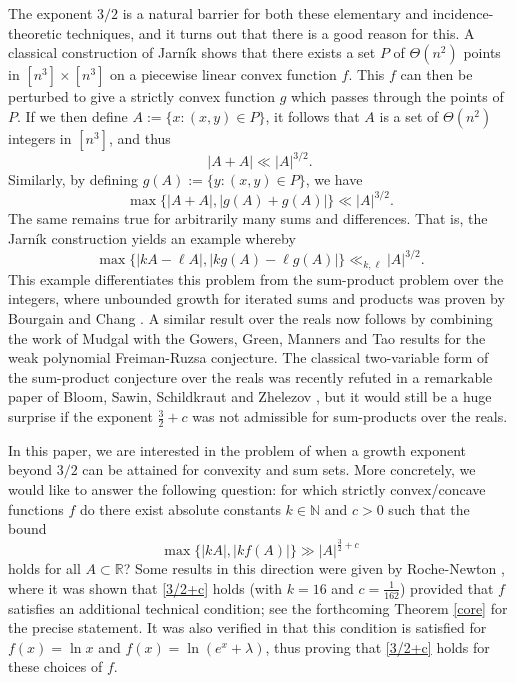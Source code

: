 \documentclass[11pt]{amsart}
\begin{document}
The exponent $3/2$ is a natural barrier for both these elementary and incidence-theoretic techniques, and it turns out that there is a good reason for this. A classical construction of Jarn\'{i}k \cite{Ja} shows that there exists a set $P$ of $\Theta(n^2)$ points in $[n^3] \times [n^3]$ on a piecewise linear convex function $f$. This $f$ can then be perturbed to give a strictly convex function $g$ which passes through the points of $P$. If we then define $A:=\{x:(x,y)\in P\}$, it follows that $A$ is a set of $\Theta(n^2)$ integers in $[n^3]$, and thus
\[
|A+ A| \ll |A|^{3/2}.
\]
Similarly, by defining $g(A):=\{y:(x,y)\in P\}$, we have
\[
\max \{|A+A|, |g(A)+ g(A)| \} \ll |A|^{3/2}.
\]
The same remains true for arbitrarily many sums and differences. That is, the Jarn\'{i}k construction yields an example whereby
\[
\max \{|kA-\ell A|, |kg(A)- \ell g(A)| \} \ll_{k,\ell} |A|^{3/2}.
\]
This example differentiates this problem from the sum-product problem over the integers, where unbounded growth for iterated sums and products was proven by Bourgain and Chang \cite{BoCh}. A similar result over the reals now follows by combining the work of Mudgal \cite{Mu} with the Gowers, Green, Manners and Tao \cite{GGMT} results for the weak polynomial Freiman-Ruzsa conjecture. The classical two-variable form of the sum-product conjecture over the reals was recently refuted in a remarkable paper of Bloom, Sawin, Schildkraut and Zhelezov \cite{BSSZ}, but it would still be a huge surprise if the exponent $\frac{3}{2}+c$ was not admissible for sum-products over the reals.

In this paper, we are interested in the problem of when a growth exponent beyond $3/2$ can be attained for convexity and sum sets. More concretely, we would like to answer the following question: for which strictly convex/concave functions $f$ do there exist absolute constants $k \in \mathbb N$ and $c>0$ such that the bound
\begin{equation} \label{3/2+c}
\max \{ |kA|, |kf(A)| \} \gg |A|^{\frac{3}{2}+c} 
\end{equation}
holds for all $A \subset \mathbb R$? Some results in this direction were given by Roche-Newton \cite{Ro}, where it was shown that \eqref{3/2+c} holds (with $k=16$ and $c=\frac{1}{162}$) provided that $f$ satisfies an additional technical condition; see the forthcoming Theorem \ref{core} for the precise statement. It was also verified in \cite{Ro} that this condition is satisfied for $f(x)= \ln x$ and $f(x)=\ln(e^x+ \lambda)$, thus proving that \eqref{3/2+c} holds for these choices of $f$.
\end{document}
